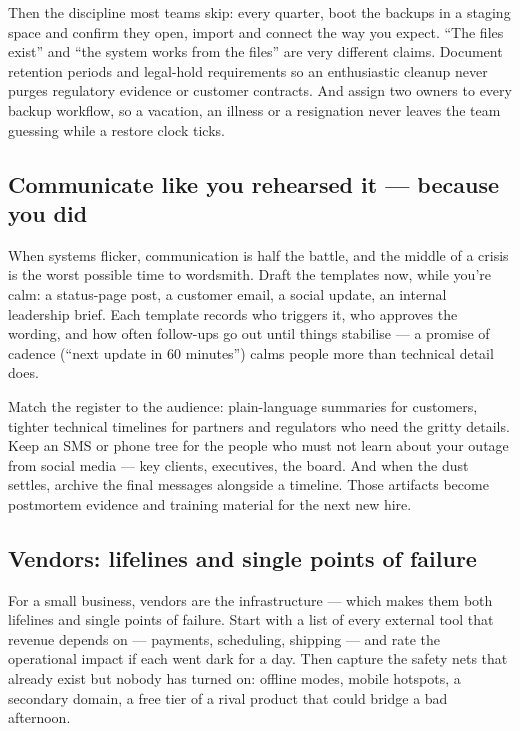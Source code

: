 Then the discipline most teams skip: every quarter, boot the backups in a staging space and confirm they open, import and connect the way you expect. ``The files exist'' and ``the system works from the files'' are very different claims. Document retention periods and legal-hold requirements so an enthusiastic cleanup never purges regulatory evidence or customer contracts. And assign two owners to every backup workflow, so a vacation, an illness or a resignation never leaves the team guessing while a restore clock ticks.



\subsection{Communicate like you rehearsed it — because you did}


When systems flicker, communication is half the battle, and the middle of a crisis is the worst possible time to wordsmith. Draft the templates now, while you're calm: a status-page post, a customer email, a social update, an internal leadership brief. Each template records who triggers it, who approves the wording, and how often follow-ups go out until things stabilise — a promise of cadence (``next update in 60 minutes'') calms people more than technical detail does.


Match the register to the audience: plain-language summaries for customers, tighter technical timelines for partners and regulators who need the gritty details. Keep an SMS or phone tree for the people who must not learn about your outage from social media — key clients, executives, the board. And when the dust settles, archive the final messages alongside a timeline. Those artifacts become postmortem evidence and training material for the next new hire.



\subsection{Vendors: lifelines and single points of failure}


For a small business, vendors are the infrastructure — which makes them both lifelines and single points of failure. Start with a list of every external tool that revenue depends on — payments, scheduling, shipping — and rate the operational impact if each went dark for a day. Then capture the safety nets that already exist but nobody has turned on: offline modes, mobile hotspots, a secondary domain, a free tier of a rival product that could bridge a bad afternoon.


